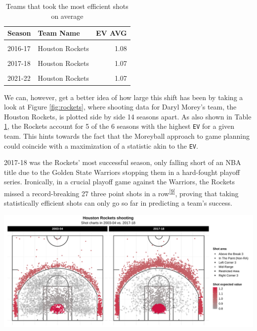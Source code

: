 \documentclass[
  12pt,
  a4paper,
]{article}
\let\origfigure\figure
\let\endorigfigure\endfigure
\renewenvironment{figure}[1][2] {
    \expandafter\origfigure\expandafter[H]
} {
    \endorigfigure
}
\begin{document}
\begin{table}

\caption{\label{tab:analytical}Teams that took
                 the most efficient shots on average}
\centering
\begin{tabular}[t]{llr}
\toprule
Season & Team Name & EV AVG\\
\midrule
\cellcolor{gray!30}{2019-20} & \cellcolor{gray!30}{Houston Rockets} & \cellcolor{gray!30}{1.08}\\
2016-17 & Houston Rockets & 1.08\\
\cellcolor{gray!30}{2018-19} & \cellcolor{gray!30}{Milwaukee Bucks} & \cellcolor{gray!30}{1.07}\\
2017-18 & Houston Rockets & 1.07\\
\cellcolor{gray!30}{2018-19} & \cellcolor{gray!30}{Houston Rockets} & \cellcolor{gray!30}{1.07}\\
2021-22 & Houston Rockets & 1.07\\
\bottomrule
\end{tabular}
\end{table}

We can, however, get a better idea of how large this shift has been by taking a look at Figure \ref{fig:rockets}, where shooting data for Daryl Morey's team, the Houston Rockets, is plotted side by side 14 seasons apart. As also shown in Table \ref{tab:analytical}, the Rockets account for 5 of the 6 seasons with the highest \texttt{EV} for a given team. This hints towards the fact that the Moreyball approach to game planning could coincide with a maximization of a statistic akin to the \texttt{EV}.

2017-18 was the Rockets' most successful season, only falling short of an NBA title due to the Golden State Warriors stopping them in a hard-fought playoff series. Ironically, in a crucial playoff game against the Warriors, the Rockets missed a record-breaking 27 three point shots in a row\textsuperscript{{[}\protect\hyperlink{ref-Rockets27}{9}{]}}, proving that taking statistically efficient shots can only go so far in predicting a team's success.

\begin{figure}

{\centering \includegraphics[width=1\linewidth]{latex/plots/plot_4} 

}

\caption{Houston Rockets shooting charts in 2003-04 and 2017-18}\label{fig:rockets}
\end{figure}
\end{document}
